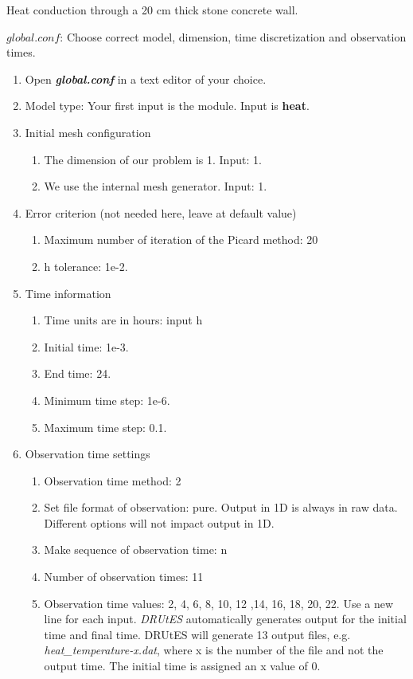 \documentclass[
10pt, %
a4paper, %
oneside, %
headinclude,footinclude, %
BCOR5mm, %
]{scrartcl}
\begin{document}
Heat conduction through a 20 cm thick stone concrete wall. 

$global.conf$: Choose correct model, dimension, time discretization and observation times.
\begin{enumerate}
\item Open \textbf{\emph{global.conf}} in a text editor of your choice. 
\item Model type: Your first input is the module. Input is \textbf{heat}.
\item Initial mesh configuration \begin{enumerate}
\item The dimension of our problem is 1. Input: 1.
\item We use the internal mesh generator. Input: 1. 
\end{enumerate}
\item Error criterion (not needed here, leave at default value) \begin{enumerate} 
\item Maximum number of iteration of the Picard method: 20 
\item h tolerance: 1e-2.
\end{enumerate}
\item Time information 
\begin{enumerate} 
\item Time units are in hours: input h
\item Initial time: 1e-3.
\item End time: 24.
\item Minimum time step: 1e-6.
\item Maximum time step: 0.1.
\end{enumerate}
\item Observation time settings \begin{enumerate}
\item Observation time method: 2
\item Set file format of observation: pure. Output in 1D is always in raw data. Different options will not impact output in 1D.
\item Make sequence of observation time: n
\item Number of observation times: 11
\item Observation time values: 2, 4, 6, 8, 10, 12 ,14, 16, 18, 20, 22. Use a new line for each input. \textit{DRUtES} automatically generates output for the initial time and final time. DRUtES will generate 13 output files, e.g. \textit{heat\_temperature-x.dat}, where x is the number of the file and not the output time. The initial time is assigned an x value of 0. 

\end{enumerate}
\end{enumerate}
\end{document}
